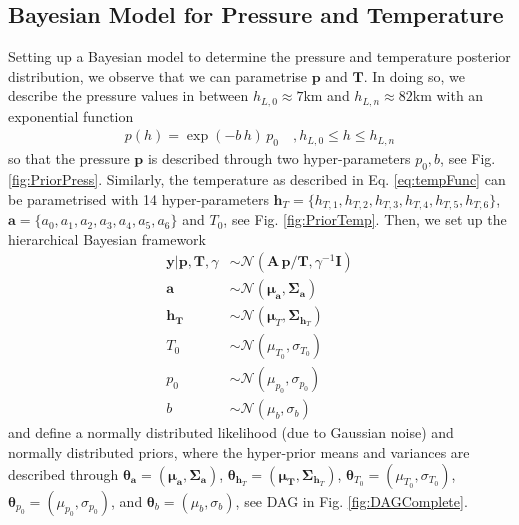 \subsection{Bayesian Model for Pressure and Temperature}
\label{subsec:PressTempSetup}
Setting up a Bayesian model to determine the pressure and temperature posterior distribution, we observe that we can parametrise $\bm{p}$ and $\bm{T}$.
In doing so, we describe the pressure values in between $h_{L,0} \approx 7$km and $h_{L,n} \approx 82$km with an exponential function
\begin{align}
	p(h) =
	\exp \left( -b \, h \right)   \,  p_0 \quad ,h_{L,0}  \leq h \leq h_{L,n}
	\label{eq:pressFunc}
\end{align}
so that the pressure $\bm{p}$ is described through two hyper-parameters $p_0,b$, see Fig. \ref{fig:PriorPress}.
Similarly, the temperature as described in Eq. \ref{eq:tempFunc} can be parametrised with 14 hyper-parameters  $\bm{h}_T = \{ h_{T,1}, h_{T,2},h_{T,3},h_{T,4},h_{T,5},h_{T,6} \}$, $\bm{a} = \{a_0, a_1, a_2,a_3,a_4,a_5,a_6 \} $ and $T_0$, see Fig. \ref{fig:PriorTemp}.
Then, we set up the hierarchical Bayesian framework
\begin{subequations}
	\begin{align}
		\bm{y} |  \bm{p}, \bm{T}, \gamma &\sim \mathcal{N}(\bm{A} \, \bm{p}/\bm{T}, \gamma^{-1} \bm{I}) \label{eq:likelihoodPT} \\
		\bm{a}  &\sim \mathcal{N}(\bm{\mu}_{\bm{a}}, \bm{\Sigma}_{\bm{a}})\\
		\bm{h}_{\bm{T}}  &\sim \mathcal{N}(\bm{\mu}_{T}, \bm{\Sigma}_{\bm{h}_T}) \\
		T_0  &\sim \mathcal{N}(\mu_{T_0}, \sigma_{T_0} )\\
		p_0  &\sim \mathcal{N}(\mu_{p_0}, \sigma_{p_0} )\\
		b  &\sim \mathcal{N}(\mu_b, \sigma_b )
	\end{align}
	\label{eq:BayMode}
\end{subequations}
and define a normally distributed likelihood (due to Gaussian noise) and normally distributed priors, where the hyper-prior means and variances are described through $\bm{\theta}_{\bm{a}} =(\bm{\mu}_{\bm{a}}, \bm{\Sigma}_{\bm{a}})$, $\bm{\theta}_{\bm{h}_T} = (\bm{\mu}_{\bm{T}}, \bm{\Sigma}_{\bm{h}_T}) $, 
$\bm{\theta}_{T_0} = (\mu_{T_0}, \sigma_{T_0})$, $\bm{\theta}_{p_0} = (\mu_{p_0}, \sigma_{p_0})$, and $\bm{\theta}_{b} = (\mu_{b}, \sigma_{b})$, see DAG in Fig. \ref{fig:DAGComplete}.


